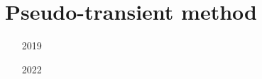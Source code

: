 
\section{Pseudo-transient method}

\begin{scriptsize}
\begin{itemize}
\item[2019] 
\item[2022] 
\end{itemize}
\end{scriptsize}





















